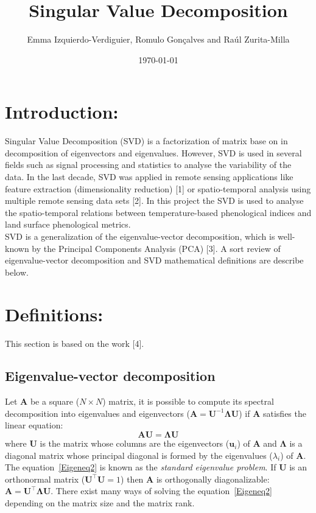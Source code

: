 \documentclass{article}
\title{Singular Value Decomposition} %
\author{Emma Izquierdo-Verdiguier, Romulo Gon\c{c}alves and Ra\'ul Zurita-Milla} %
\date{\today} %
\def\A{{\mathbf A}}
\def\U{{\mathbf U}}
\def\u{{\mathbf u}}
\begin{document}
\maketitle %


% 

\section{Introduction:}
Singular Value Decomposition (SVD) is a factorization of matrix base on in decomposition of eigenvectors and eigenvalues. However, SVD is used in several fields such as signal processing and statistics to analyse the variability of the data. In the last decade, SVD was applied in remote sensing applications like feature extraction (dimensionality reduction) [1] or spatio-temporal analysis using multiple remote sensing data sets [2]. In this project the SVD is used to analyse the spatio-temporal relations between temperature-based phenological indices and land surface phenological metrics.\\

SVD is a generalization of the eigenvalue-vector decomposition, which is well-known by the Principal Components Analysis (PCA) [3]. A sort review of eigenvalue-vector decomposition and SVD mathematical definitions are describe below. 

\section{Definitions:}
This section is based on the work [4].

\subsection{Eigenvalue-vector decomposition}
Let $\A$ be a square ($N \times N$) matrix, it is possible to compute its spectral decomposition into eigenvalues and eigenvectors ($\A=\U^{-1}\boldsymbol{\Lambda} \U$) if $\A$ satisfies the linear equation:
\begin{equation}
\label{Eigeneq2} \A \U=\boldsymbol{\Lambda} \U 
\end{equation}
where $\U$ is the matrix whose columns are the eigenvectors ($\u_i$) of $\A$ and $\boldsymbol{\Lambda}$ is a diagonal matrix whose principal diagonal is formed by the eigenvalues ($\lambda_i$) of $\A$. The equation~\eqref{Eigeneq2} is known as the {\em standard eigenvalue problem}. If $\U$ is an orthonormal matrix ($\U^{\top}\U=1$) then $\A$ is orthogonally diagonalizable: $\A=\U^{\top}\boldsymbol{\Lambda} \U$.
There exist many ways of solving the equation~\eqref{Eigeneq2} depending on the matrix size and the matrix rank.
\end{document}
